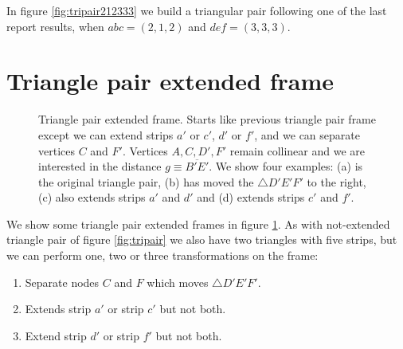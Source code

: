 \documentclass[11pt]{article}
\begin{document}
In figure \ref{fig:tripair212333} we build a triangular pair following one of the last report results, when $abc=(2,1,2)$ and $def=(3,3,3)$.


\section{Triangle pair extended frame}

\begin{figure}[H]
 \centering
 \caption{Triangle pair extended frame. Starts like previous triangle pair frame except
 we can extend strips $a'$ or $c'$, $d'$ or $f'$, and we can separate vertices $C$ and $F'$.
 Vertices $A,C,D',F'$ remain collinear and we are interested in the distance $g \equiv \overline{B'E'}$. We show four examples: (a) is the original triangle pair,
 (b) has moved the $\triangle{D'E'F'}$ to the right,
 (c) also extends strips $a'$ and $d'$ and (d) extends strips $c'$ and $f'$.
 }
 \label{fig:tripairext}
\end{figure}

We show some triangle pair extended frames in figure \ref{fig:tripairext}.
As with not-extended triangle pair of figure \ref{fig:tripair} we also have two triangles with five strips, but we can perform one, two or three transformations on the frame: 
\begin{enumerate}
 \item Separate nodes $C$ and $F$ which moves $\triangle{D'E'F'}$.
 \item Extends strip $a'$ or strip $c'$ but not both.
 \item Extend strip $d'$ or strip $f'$ but not both.
\end{enumerate}
\end{document}

